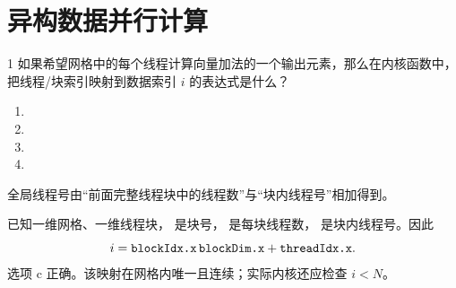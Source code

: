 \chapter{异构数据并行计算}

\begin{solutionexercise}{1}
\problemheading 如果希望网格中的每个线程计算向量加法的一个输出元素，那么在内核函数中，
把线程/块索引映射到数据索引 $i$ 的表达式是什么？
\begin{enumerate}[label=\alph*.,leftmargin=2.2em]
  \item {}
  \item {}
  \item {}
  \item {}
\end{enumerate}

\approachheading 全局线程号由“前面完整线程块中的线程数”与“块内线程号”相加得到。

\answerheading 已知一维网格、一维线程块， 是块号，
是每块线程数， 是块内线程号。因此
\[
 i=\code{blockIdx.x}\,\code{blockDim.x}+\code{threadIdx.x}.
\]
选项 c 正确。该映射在网格内唯一且连续；实际内核还应检查 $i<N$。


\end{solutionexercise}
